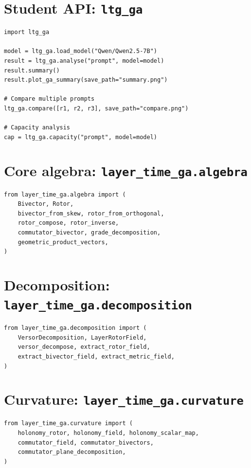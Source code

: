 \documentclass[11pt, twoside, openright]{memoir}
\begin{document}
\section{Student API: \texttt{ltg\_ga}}

\begin{lstlisting}
import ltg_ga

model = ltg_ga.load_model("Qwen/Qwen2.5-7B")
result = ltg_ga.analyse("prompt", model=model)
result.summary()
result.plot_ga_summary(save_path="summary.png")

# Compare multiple prompts
ltg_ga.compare([r1, r2, r3], save_path="compare.png")

# Capacity analysis
cap = ltg_ga.capacity("prompt", model=model)
\end{lstlisting}

\section{Core algebra: \texttt{layer\_time\_ga.algebra}}

\begin{lstlisting}
from layer_time_ga.algebra import (
    Bivector, Rotor,
    bivector_from_skew, rotor_from_orthogonal,
    rotor_compose, rotor_inverse,
    commutator_bivector, grade_decomposition,
    geometric_product_vectors,
)
\end{lstlisting}

\section{Decomposition: \texttt{layer\_time\_ga.decomposition}}

\begin{lstlisting}
from layer_time_ga.decomposition import (
    VersorDecomposition, LayerRotorField,
    versor_decompose, extract_rotor_field,
    extract_bivector_field, extract_metric_field,
)
\end{lstlisting}

\section{Curvature: \texttt{layer\_time\_ga.curvature}}

\begin{lstlisting}
from layer_time_ga.curvature import (
    holonomy_rotor, holonomy_field, holonomy_scalar_map,
    commutator_field, commutator_bivectors,
    commutator_plane_decomposition,
)
\end{lstlisting}
\end{document}
